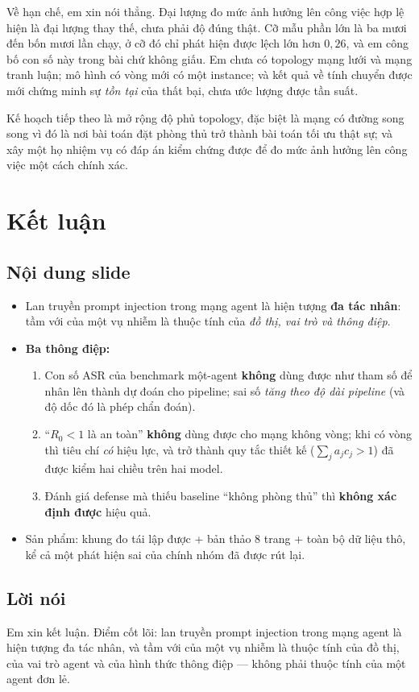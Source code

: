 \documentclass[11pt,a4paper]{article}
\newcommand{\slide}[1]{\section{#1}}
\newcommand{\noidung}{\subsection*{Nội dung slide}}
\newcommand{\loinoi}{\subsection*{Lời nói}}
\begin{document}
Về hạn chế, em xin nói thẳng. Đại lượng đo mức ảnh hưởng lên công việc hợp lệ hiện là
đại lượng thay thế, chưa phải độ đúng thật. Cỡ mẫu phần lớn là ba mươi đến bốn mươi lần
chạy, ở cỡ đó chỉ phát hiện được lệch lớn hơn $0{,}26$, và em công bố con số này trong
bài chứ không giấu. Em chưa có topology mạng lưới và mạng tranh luận; mô hình có vòng mới
có một instance; và kết quả về tính chuyển được mới chứng minh sự \emph{tồn tại} của thất
bại, chưa ước lượng được tần suất.

Kế hoạch tiếp theo là mở rộng độ phủ topology, đặc biệt là mạng có đường song song vì đó
là nơi bài toán đặt phòng thủ trở thành bài toán tối ưu thật sự; và xây một họ nhiệm vụ
có đáp án kiểm chứng được để đo mức ảnh hưởng lên công việc một cách chính xác.

\slide{Kết luận}

\noidung
\begin{itemize}
  \item Lan truyền prompt injection trong mạng agent là hiện tượng \textbf{đa tác nhân}:
        tầm với của một vụ nhiễm là thuộc tính của \emph{đồ thị, vai trò và thông điệp}.
  \item \textbf{Ba thông điệp:}
        \begin{enumerate}
          \item Con số ASR của benchmark một-agent \textbf{không} dùng được như tham số
                để nhân lên thành dự đoán cho pipeline; sai số \emph{tăng theo độ dài
                pipeline} (và độ dốc đó là phép chẩn đoán).
          \item ``$R_0<1$ là an toàn'' \textbf{không} dùng được cho mạng không vòng; khi
                có vòng thì tiêu chí \emph{có} hiệu lực, và trở thành quy tắc thiết kế
                ($\sum_j a_jc_j>1$) đã được kiểm hai chiều trên hai model.
          \item Đánh giá defense mà thiếu baseline ``không phòng thủ'' thì
                \textbf{không xác định được} hiệu quả.
        \end{enumerate}
  \item Sản phẩm: khung đo tái lập được + bản thảo 8 trang + toàn bộ dữ liệu thô, kể cả
        một phát hiện sai của chính nhóm đã được rút lại.
\end{itemize}

\loinoi
Em xin kết luận. Điểm cốt lõi: lan truyền prompt injection trong mạng agent là hiện tượng
đa tác nhân, và tầm với của một vụ nhiễm là thuộc tính của đồ thị, của vai trò agent và
của hình thức thông điệp --- không phải thuộc tính của một agent đơn lẻ.
\end{document}
